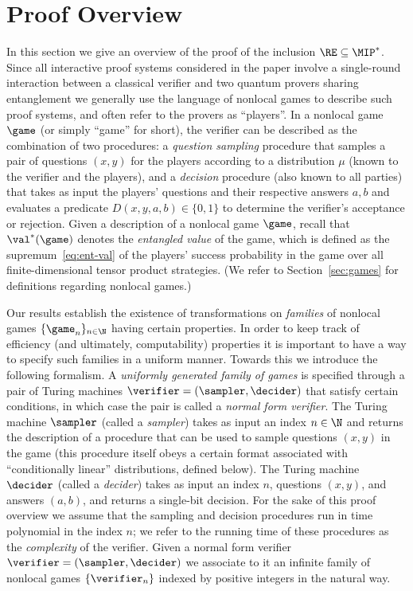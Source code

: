 \section{Proof Overview}
\label{sec:overview}

In this section we give an overview of the proof of the inclusion $\RE \subseteq \MIP^*$. Since all interactive proof systems considered in the paper involve a single-round interaction between a classical verifier and two quantum provers sharing entanglement we generally use the language of nonlocal games to describe such proof systems, and often refer to the provers as ``players''. In a nonlocal game $\game$ (or simply ``game'' for short), the verifier can be described as the combination of two procedures: a \emph{question sampling} procedure that samples a pair of questions $(x,y)$ for the players according to a distribution $\mu$ (known to the verifier and the players), and a \emph{decision} procedure (also known to all parties) that takes as input the players' questions and their respective answers $a,b$ and evaluates a predicate $D(x,y,a,b)\in \{0,1\}$ to determine the verifier's acceptance or rejection. Given a description of a nonlocal game $\game$, recall that $\val^*(\game)$ denotes the \emph{entangled value} of the game, which is defined as the supremum~\eqref{eq:ent-val} of the players' success probability in the game over all finite-dimensional tensor product strategies. (We refer to Section~\ref{sec:games} for definitions regarding nonlocal games.) 

Our results establish the existence of transformations on \emph{families} of nonlocal games $\{\game_n\}_{n\in \N}$ having certain properties. In order to keep track of efficiency (and ultimately, computability) properties it is important to have a way to specify such families in a {uniform} manner. Towards this we introduce the following formalism. A \emph{uniformly generated family of games} is specified through a pair of Turing machines $\verifier = (\sampler,\decider)$ that satisfy certain conditions, in which case the pair is called a \emph{normal form verifier}. The Turing machine $\sampler$ (called a \emph{sampler}) takes as input an index $n \in \N$ and returns the description of a procedure that can be used to sample questions $(x,y)$ in the game (this procedure itself obeys a certain format associated with ``conditionally linear'' distributions, defined below). The Turing machine $\decider$ (called a \emph{decider}) takes as input an index $n$, questions $(x,y)$, and answers $(a,b)$, and returns a single-bit decision. For the sake of this proof overview we assume that the sampling and decision procedures run in time polynomial in the index $n$; we refer to the running time of these procedures as the \emph{complexity} of the verifier. 
	Given a normal form verifier $\verifier= (\sampler,\decider)$ we associate to it an infinite family of nonlocal games $\{\verifier_n \}$ indexed by positive integers in the natural way.  
	


